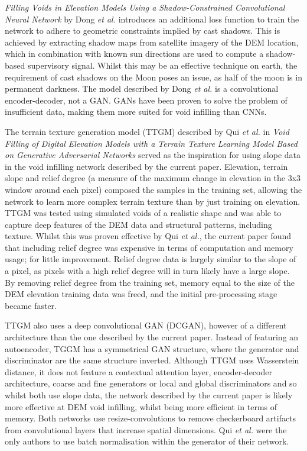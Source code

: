 \documentclass[twocolumn]{article}
\begin{document}
\emph{Filling Voids in Elevation Models Using a Shadow-Constrained Convolutional Neural Network} by Dong \emph{et al.}\autocite{dongFillingVoidsElevation2020} introduces an additional loss function to train the network to adhere to geometric constraints implied by cast shadows.
This is achieved by extracting shadow maps from satellite imagery of the DEM location, which in combination with known sun directions are used to compute a shadow-based supervisory signal.
Whilst this may be an effective technique on earth, the requirement of cast shadows on the Moon poses an issue, as half of the moon is in permanent darkness.
The model described by Dong \emph{et al.} is a convolutional encoder-decoder, not a GAN.
GANs have been proven to solve the problem of insufficient data\autocite{nandhiniabiramiDeepCNNDeep2021}, making them more suited for void infilling than CNNs.

The terrain texture generation model (TTGM) described by Qui \emph{et al.} in \emph{Void Filling of Digital Elevation Models with a Terrain Texture Learning Model Based on Generative Adversarial Networks}\autocite{qiuVoidFillingDigital2019} served as the inspiration for using slope data in the void infilling network described by the current paper.
Elevation, terrain slope and relief degree (a measure of the maximum change in elevation in the 3x3 window around each pixel) composed the samples in the training set, allowing the network to learn more complex terrain texture than by just training on elevation.
TTGM was tested using simulated voids of a realistic shape and was able to capture deep features of the DEM data and structural patterns, including texture.
Whilst this was proven effective by Qui \emph{et al.}, the current paper found that including relief degree was expensive in terms of computation and memory usage; for little improvement.
Relief degree data is largely similar to the slope of a pixel, as pixels with a high relief degree will in turn likely have a large slope.
By removing relief degree from the training set, memory equal to the size of the DEM elevation training data was freed, and the initial pre-processing stage became faster.

TTGM also uses a deep convolutional GAN (DCGAN), however of a different architecture than the one described by the current paper.
Instead of featuring an autoencoder, TGGM has a symmetrical GAN structure, where the generator and discriminator are the same structure inverted.
Although TTGM uses Wasserstein distance, it does not feature a contextual attention layer, encoder-decoder architecture, coarse and fine generators or local and global discriminators and so whilst both use slope data, the network described by the current paper is likely more effective at DEM void infilling, whilst being more efficient in terms of memory.
Both networks use resize-convolutions\autocite{aitkenCheckerboardArtifactFree2017}\autocite{odenaDeconvolutionCheckerboardArtifacts2016} to remove checkerboard artifacts from convolutional layers that increase spatial dimensions.
Qui \emph{et al.} were the only authors to use batch normalisation within the generator of their network.
\end{document}
